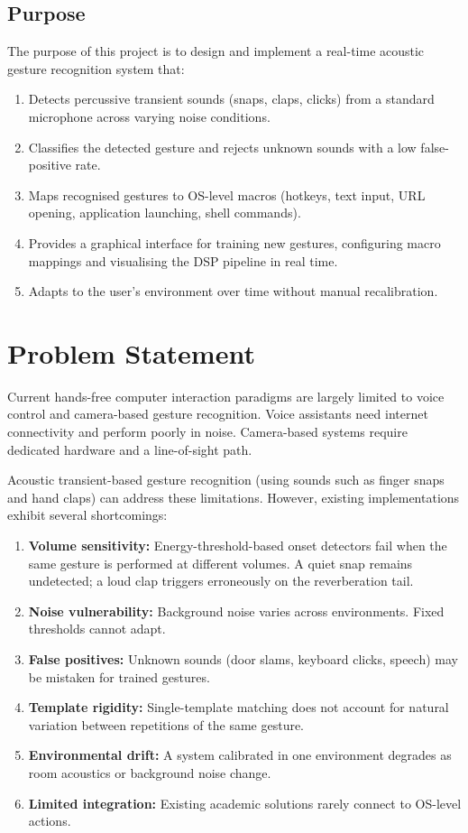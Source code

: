 \documentclass[12pt,a4paper]{article}
\begin{document}
\subsection{Purpose}

The purpose of this project is to design and implement a real-time acoustic gesture recognition system that:

\begin{enumerate}
    \item Detects percussive transient sounds (snaps, claps, clicks) from a standard microphone across varying noise conditions.
    \item Classifies the detected gesture and rejects unknown sounds with a low false-positive rate.
    \item Maps recognised gestures to OS-level macros (hotkeys, text input, URL opening, application launching, shell commands).
    \item Provides a graphical interface for training new gestures, configuring macro mappings and visualising the DSP pipeline in real time.
    \item Adapts to the user's environment over time without manual recalibration.
\end{enumerate}

\section{Problem Statement}

Current hands-free computer interaction paradigms are largely limited to voice control and camera-based gesture recognition. Voice assistants need internet connectivity and perform poorly in noise. Camera-based systems require dedicated hardware and a line-of-sight path.

Acoustic transient-based gesture recognition (using sounds such as finger snaps and hand claps) can address these limitations. However, existing implementations exhibit several shortcomings:

\begin{enumerate}
    \item \textbf{Volume sensitivity:} Energy-threshold-based onset detectors fail when the same gesture is performed at different volumes. A quiet snap remains undetected; a loud clap triggers erroneously on the reverberation tail.
    \item \textbf{Noise vulnerability:} Background noise varies across environments. Fixed thresholds cannot adapt.
    \item \textbf{False positives:} Unknown sounds (door slams, keyboard clicks, speech) may be mistaken for trained gestures.
    \item \textbf{Template rigidity:} Single-template matching does not account for natural variation between repetitions of the same gesture.
    \item \textbf{Environmental drift:} A system calibrated in one environment degrades as room acoustics or background noise change.
    \item \textbf{Limited integration:} Existing academic solutions rarely connect to OS-level actions.
\end{enumerate}
\end{document}
